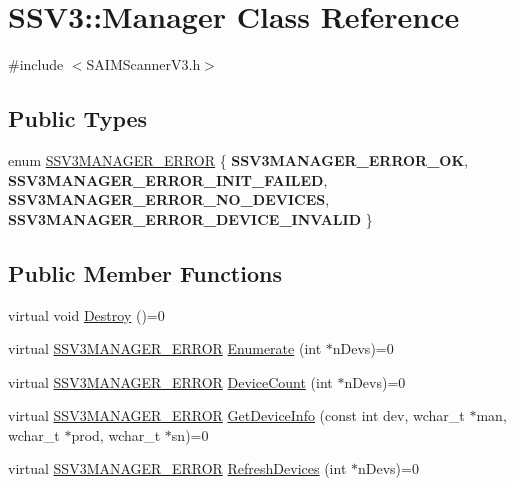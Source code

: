 \hypertarget{classSSV3_1_1Manager}{\section{S\-S\-V3\-:\-:Manager Class Reference}
\label{classSSV3_1_1Manager}
}


{\ttfamily \#include $<$S\-A\-I\-M\-Scanner\-V3.\-h$>$}

\subsection*{Public Types}
\begin{DoxyCompactItemize}
\item 
enum \hyperlink{classSSV3_1_1Manager_a29b6ac14b348cc4676523f74f8d0a8e1}{S\-S\-V3\-M\-A\-N\-A\-G\-E\-R\-\_\-\-E\-R\-R\-O\-R} \{ {\bfseries S\-S\-V3\-M\-A\-N\-A\-G\-E\-R\-\_\-\-E\-R\-R\-O\-R\-\_\-\-O\-K}, 
{\bfseries S\-S\-V3\-M\-A\-N\-A\-G\-E\-R\-\_\-\-E\-R\-R\-O\-R\-\_\-\-I\-N\-I\-T\-\_\-\-F\-A\-I\-L\-E\-D}, 
{\bfseries S\-S\-V3\-M\-A\-N\-A\-G\-E\-R\-\_\-\-E\-R\-R\-O\-R\-\_\-\-N\-O\-\_\-\-D\-E\-V\-I\-C\-E\-S}, 
{\bfseries S\-S\-V3\-M\-A\-N\-A\-G\-E\-R\-\_\-\-E\-R\-R\-O\-R\-\_\-\-D\-E\-V\-I\-C\-E\-\_\-\-I\-N\-V\-A\-L\-I\-D}
 \}
\end{DoxyCompactItemize}
\subsection*{Public Member Functions}
\begin{DoxyCompactItemize}
\item 
virtual void \hyperlink{classSSV3_1_1Manager_af81c512bd20f24b3759834062f9c1287}{Destroy} ()=0
\item 
virtual \hyperlink{classSSV3_1_1Manager_a29b6ac14b348cc4676523f74f8d0a8e1}{S\-S\-V3\-M\-A\-N\-A\-G\-E\-R\-\_\-\-E\-R\-R\-O\-R} \hyperlink{classSSV3_1_1Manager_abbcf07ea9aee51a09a6035086da0df6e}{Enumerate} (int $\ast$n\-Devs)=0
\item 
virtual \hyperlink{classSSV3_1_1Manager_a29b6ac14b348cc4676523f74f8d0a8e1}{S\-S\-V3\-M\-A\-N\-A\-G\-E\-R\-\_\-\-E\-R\-R\-O\-R} \hyperlink{classSSV3_1_1Manager_ab8628bbde656c4fda84685bca801606a}{Device\-Count} (int $\ast$n\-Devs)=0
\item 
virtual \hyperlink{classSSV3_1_1Manager_a29b6ac14b348cc4676523f74f8d0a8e1}{S\-S\-V3\-M\-A\-N\-A\-G\-E\-R\-\_\-\-E\-R\-R\-O\-R} \hyperlink{classSSV3_1_1Manager_a20142bb2d1df235738ff5e651eea7331}{Get\-Device\-Info} (const int dev, wchar\-\_\-t $\ast$man, wchar\-\_\-t $\ast$prod, wchar\-\_\-t $\ast$sn)=0
\item 
virtual \hyperlink{classSSV3_1_1Manager_a29b6ac14b348cc4676523f74f8d0a8e1}{S\-S\-V3\-M\-A\-N\-A\-G\-E\-R\-\_\-\-E\-R\-R\-O\-R} \hyperlink{classSSV3_1_1Manager_a1839a87d09246a89b15e3da91c57be6e}{Refresh\-Devices} (int $\ast$n\-Devs)=0
\end{DoxyCompactItemize}


